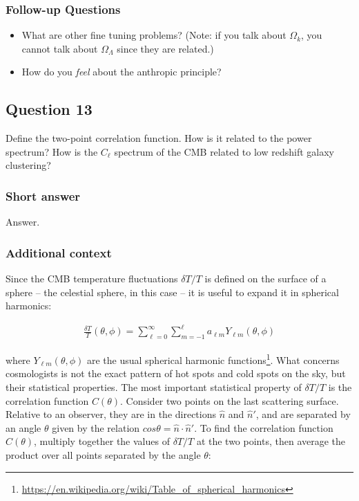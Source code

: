 \documentclass[a4paper,11pt]{article}
\begin{document}
\subsubsection{Follow-up Questions}

\begin{itemize}
    \item What are other fine tuning problems? (Note: if you talk about $\Omega_k$, you cannot talk about $\Omega_\Lambda$ since they are related.)
    \item How do you \textit{feel} about the anthropic principle?
\end{itemize}


%
%

\newpage
\subsection{Question 13}

Define the two-point correlation function. How is it related to the power spectrum? How is the $C_\ell$ spectrum of the CMB related to low redshift galaxy clustering?

\subsubsection{Short answer}

Answer.

\subsubsection{Additional context}

Since the CMB temperature fluctuations $\delta T/T$ is defined on the surface of a sphere -- the celestial sphere, in this case -- it is useful to expand it in spherical harmonics:

\begin{align*}
    \frac{\delta T}{T}(\theta,\phi) = \sum\limits_{\ell=0}^{\infty}\sum\limits_{m=-1}^{\ell} a_{\ell m}Y_{\ell m}(\theta,\phi)
\end{align*}

{\noindent}where $Y_{\ell m}(\theta,\phi)$ are the usual spherical harmonic functions\footnote{\href{https://en.wikipedia.org/wiki/Table\_of\_spherical\_harmonics}{https://en.wikipedia.org/wiki/Table\_of\_spherical\_harmonics}}. What concerns cosmologists is not the exact pattern of hot spots and cold spots on the sky, but their statistical properties. The most important statistical property of $\delta T/T$ is the correlation function $C(\theta)$. Consider two points on the last scattering surface. Relative to an observer, they are in the directions $\hat{n}$ and $\hat{n}'$, and are separated by an angle $\theta$ given by the relation $cos\theta=\hat{n}\cdot\hat{n}'$. To find the correlation function $C(\theta)$, multiply together the values of $\delta T/T$ at the two points, then average the product over all points separated by the angle $\theta$:
\end{document}
